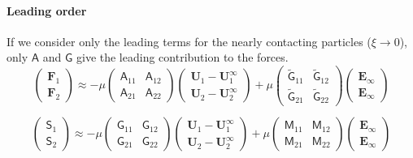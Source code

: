 \documentclass[12pt]{article}
\newcommand{\tens}[1]{\bm{\mathsf{#1}}}
\begin{document}
\paragraph{Leading order}
If we consider only the leading terms for 
the nearly contacting particles ($\xi \to 0$),
only $\tens{A}$ and $\tens{G}$ give the leading contribution to the forces.
\begin{equation}
 \begin{pmatrix}
  \bm{F}_{1} \\
  \bm{F}_{2} 
 \end{pmatrix}
\approx
- \mu
\begin{pmatrix}
\tens{A}_{11} &
\tens{A}_{12}  \\
\tens{A}_{21}  &
\tens{A}_{22}  
\end{pmatrix}
 \begin{pmatrix}
  \bm{U}_{1} -  \bm{U}_{1}^{\infty}\\
  \bm{U}_{2} -  \bm{U}_{2}^{\infty}
 \end{pmatrix}
 + \mu
\begin{pmatrix}
\tilde{\tens{G}}_{11} &
\tilde{\tens{G}}_{12}  \\
\tilde{\tens{G}}_{21}  &
\tilde{\tens{G}}_{22}  
\end{pmatrix}
 \begin{pmatrix}
\bm{E}_{\infty} \\ \bm{E}_{\infty}
\end{pmatrix}
\end{equation}

\begin{equation}
 \begin{pmatrix}
  \tens{S}_{1} \\
  \tens{S}_{2} 
 \end{pmatrix}
\approx
- \mu
\begin{pmatrix}
\tens{G}_{11} &
\tens{G}_{12}  \\
\tens{G}_{21}  &
\tens{G}_{22}  
\end{pmatrix}
 \begin{pmatrix}
  \bm{U}_{1} -  \bm{U}_{1}^{\infty}\\
  \bm{U}_{2} -  \bm{U}_{2}^{\infty}
 \end{pmatrix}
 + \mu
\begin{pmatrix}
\tens{M}_{11} &
\tens{M}_{12}  \\
\tens{M}_{21}  &
\tens{M}_{22}  
\end{pmatrix}
 \begin{pmatrix}
\bm{E}_{\infty} \\ \bm{E}_{\infty}
\end{pmatrix}
\end{equation}
\end{document}
